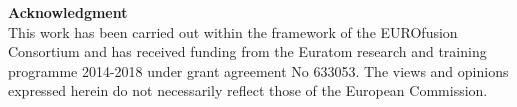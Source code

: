 \documentclass[12pt, a4paper, twoside]{article}
\begin{document}
\begingroup
{}
{\footnotesize\textbf{Acknowledgment}\\
This work has been carried out within the framework of the EUROfusion Consortium and has received funding from the Euratom
research and training programme 2014-2018 under grant agreement No 633053. The views and opinions expressed herein do not
necessarily reflect those of the European Commission.}
\begin{multicols}{2}
\setlength\bibitemsep{0pt}
\printbibliography[heading=none]
\end{multicols}
\endgroup
\end{document}
